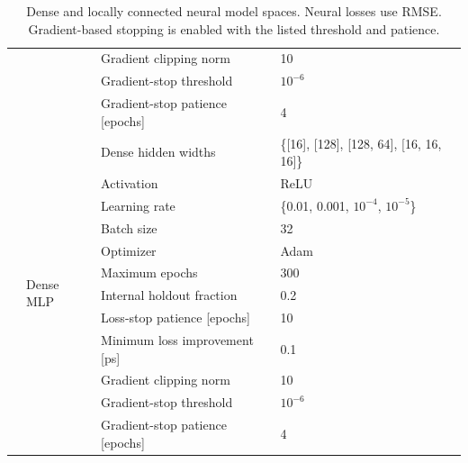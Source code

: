 \begin{table}[t]
\begin{tabularx}{\textwidth}{@{}p{}p{}p{}X@{}}
 &  & Gradient clipping norm & 10 \\
 &  & Gradient-stop threshold & $10^{-6}$ \\
 &  & Gradient-stop patience [epochs] & 4 \\
\addlinespace[3pt]
\hdashline
\addlinespace[3pt]
\multirow[t]{12}{*}{Direct} & \multirow[t]{12}{=}{Dense MLP} & Dense hidden widths & \{[16], [128], [128, 64], [16, 16, 16]\} \\
 &  & Activation & ReLU \\
 &  & Learning rate & \{0.01, 0.001, $10^{-4}$, $10^{-5}$\} \\
 &  & Batch size & 32 \\
 &  & Optimizer & Adam \\
 &  & Maximum epochs & 300 \\
 &  & Internal holdout fraction & 0.2 \\
 &  & Loss-stop patience [epochs] & 10 \\
 &  & Minimum loss improvement [ps] & 0.1 \\
 &  & Gradient clipping norm & 10 \\
 &  & Gradient-stop threshold & $10^{-6}$ \\
 &  & Gradient-stop patience [epochs] & 4 \\
\bottomrule
\end{tabularx}
\caption{Dense and locally connected neural model spaces. Neural losses use RMSE. Gradient-based stopping is enabled with the listed threshold and patience.}
\label{tab:space-dense-and-local}
\end{table}
